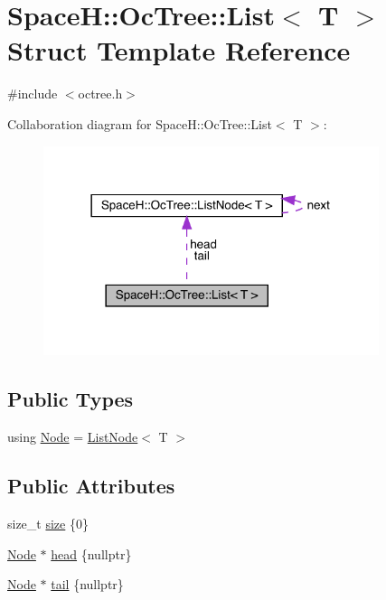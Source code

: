\hypertarget{struct_space_h_1_1_oc_tree_1_1_list}{}\section{SpaceH\+:\+:Oc\+Tree\+:\+:List$<$ T $>$ Struct Template Reference}
\label{struct_space_h_1_1_oc_tree_1_1_list}


{\ttfamily \#include $<$octree.\+h$>$}



Collaboration diagram for SpaceH\+:\+:Oc\+Tree\+:\+:List$<$ T $>$\+:
\nopagebreak
\begin{figure}[H]
\begin{center}
\leavevmode
\includegraphics[width=278pt]{struct_space_h_1_1_oc_tree_1_1_list__coll__graph}
\end{center}
\end{figure}
\subsection*{Public Types}
\begin{DoxyCompactItemize}
\item 
using \mbox{\hyperlink{struct_space_h_1_1_oc_tree_1_1_list_ae787f0bcf88c840b7a5da72d48fe5041}{Node}} = \mbox{\hyperlink{struct_space_h_1_1_oc_tree_1_1_list_node}{List\+Node}}$<$ T $>$
\end{DoxyCompactItemize}
\subsection*{Public Attributes}
\begin{DoxyCompactItemize}
\item 
size\+\_\+t \mbox{\hyperlink{struct_space_h_1_1_oc_tree_1_1_list_aa385a8c05f2e0ff920ae5aff8985ba59}{size}} \{0\}
\item 
\mbox{\hyperlink{struct_space_h_1_1_oc_tree_1_1_list_ae787f0bcf88c840b7a5da72d48fe5041}{Node}} $\ast$ \mbox{\hyperlink{struct_space_h_1_1_oc_tree_1_1_list_af74d1aa423831edea1feba9363e4dc6a}{head}} \{nullptr\}
\item 
\mbox{\hyperlink{struct_space_h_1_1_oc_tree_1_1_list_ae787f0bcf88c840b7a5da72d48fe5041}{Node}} $\ast$ \mbox{\hyperlink{struct_space_h_1_1_oc_tree_1_1_list_a462081f7696b8ade48648ef0c5dd38ef}{tail}} \{nullptr\}
\end{DoxyCompactItemize}


